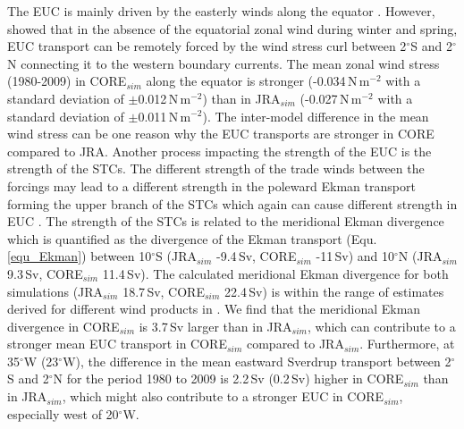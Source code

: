 \documentclass[os, manuscript]{copernicus}
\begin{document}
The EUC is mainly driven by the easterly winds along the equator \citep{Pedlosky1987,Wacongne1989}. However, \cite{Arhan2006} showed that in the absence of the equatorial zonal wind during winter and spring, EUC transport can be remotely forced by the wind stress curl between 2$^{\circ}$S and 2$^{\circ}$N connecting it to the western boundary currents. The mean zonal wind stress (1980-2009) in CORE$_{sim}$ along the equator is stronger (-0.034$\,$N$\,$m$ ^{-2} $ with a standard deviation  of $ \pm $0.012$\,$N$\,$m$ ^{-2} $) than in JRA$_{sim}$ (-0.027$\,$N$\,$m$ ^{-2} $ with a standard deviation  of $ \pm $0.011$\,$N$\,$m$ ^{-2} $). The inter-model difference in the mean wind stress can be one reason why the EUC transports are stronger in CORE compared to JRA. Another process impacting the strength of the EUC is the strength of the STCs. The different strength of the trade winds between the forcings may lead to a different strength in the poleward Ekman transport forming the upper branch of the STCs which again can cause different strength in EUC \citep{Rabe2008}. The strength of the STCs is related to the meridional Ekman divergence which is quantified as the divergence of the Ekman transport (Equ. \ref{equ_Ekman}) between 10$^{\circ}$S (JRA$_{sim}$ -9.4$\,$Sv, CORE$_{sim}$ -11$\,$Sv) and 10$^{\circ}$N (JRA$_{sim}$ 9.3$\,$Sv, CORE$_{sim}$ 11.4$\,$Sv). The calculated meridional Ekman divergence for both simulations (JRA$_{sim}$ 18.7$\,$Sv, CORE$_{sim}$ 22.4$\,$Sv) is within the range of estimates derived for different wind products in \citet[][20.4$ \pm $3.1$\,$Sv]{Tuchen2019}. We find that the meridional Ekman divergence in CORE$_{sim}$ is 3.7$\,$Sv larger than in JRA$_{sim}$, which can contribute to a stronger mean EUC transport in CORE$_{sim}$ compared to JRA$_{sim}$. Furthermore, at 35$^{\circ}$W (23$^{\circ}$W), the difference in the mean eastward Sverdrup transport between 2$^{\circ}$S and 2$^{\circ}$N for the period 1980 to 2009 is 2.2$\,$Sv (0.2$\,$Sv) higher in CORE$_{sim}$ than in JRA$_{sim}$, which might also contribute to a stronger EUC in CORE$_{sim}$, especially west of 20$^{\circ}$W.
\end{document}
